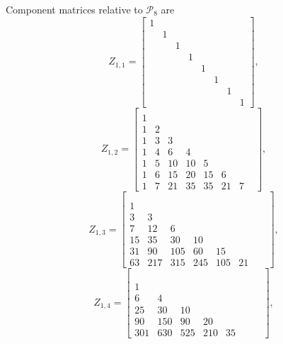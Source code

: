 \begin{example}
Component matrices relative to $\mathcal{P}_{8}$ are
\begin{displaymath}
Z_{1,1} = \left[\begin{matrix}1 &  &  &  &  &  &  & \\ & 1 &  &  &  &  &  & \\ &  & 1 &  &  &  &  & \\ &  &  & 1 &  &  &  & \\ &  &  &  & 1 &  &  & \\ &  &  &  &  & 1 &  & \\ &  &  &  &  &  & 1 & \\ &  &  &  &  &  &  & 1\end{matrix}\right],
\end{displaymath}
\begin{displaymath}
Z_{1,2} = \left[\begin{matrix} &  &  &  &  &  &  & \\1 &  &  &  &  &  &  & \\1 & 2 &  &  &  &  &  & \\1 & 3 & 3 &  &  &  &  & \\1 & 4 & 6 & 4 &  &  &  & \\1 & 5 & 10 & 10 & 5 &  &  & \\1 & 6 & 15 & 20 & 15 & 6 &  & \\1 & 7 & 21 & 35 & 35 & 21 & 7 & \end{matrix}\right],
\end{displaymath}
\begin{displaymath}
Z_{1,3} = \left[\begin{matrix} &  &  &  &  &  &  & \\ &  &  &  &  &  &  & \\1 &  &  &  &  &  &  & \\3 & 3 &  &  &  &  &  & \\7 & 12 & 6 &  &  &  &  & \\15 & 35 & 30 & 10 &  &  &  & \\31 & 90 & 105 & 60 & 15 &  &  & \\63 & 217 & 315 & 245 & 105 & 21 &  & \end{matrix}\right],
\end{displaymath}
\begin{displaymath}
Z_{1,4} = \left[\begin{matrix} &  &  &  &  &  &  & \\ &  &  &  &  &  &  & \\ &  &  &  &  &  &  & \\1 &  &  &  &  &  &  & \\6 & 4 &  &  &  &  &  & \\25 & 30 & 10 &  &  &  &  & \\90 & 150 & 90 & 20 &  &  &  & \\301 & 630 & 525 & 210 & 35 &  &  & \end{matrix}\right],

\end{displaymath}
\end{example}
